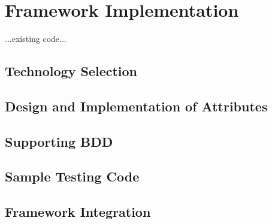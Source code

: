 
\chapter{Framework Implementation\label{chap:framework_implementation}}

...existing code...

\section{Technology Selection}


\section{Design and Implementation of Attributes}


\section{Supporting BDD}


\section{Sample Testing Code}


\section{Framework Integration}

